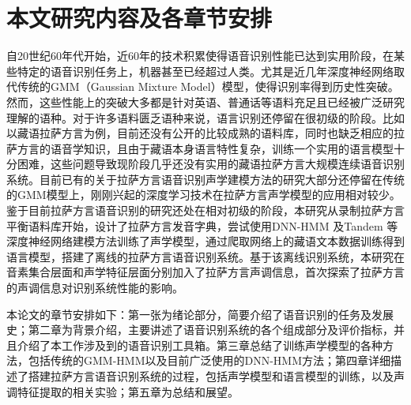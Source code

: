 \section{本文研究内容及各章节安排}
自20世纪60年代开始，近60年的技术积累使得语音识别性能已达到实用阶段，在某些特定的语音识别任务上，机器甚至已经超过人类。尤其是近几年深度神经网络取代传统的GMM（Gaussian Mixture Model）模型，使得识别率得到历史性突破。然而，这些性能上的突破大多都是针对英语、普通话等语料充足且已经被广泛研究理解的语种。对于许多语料匮乏语种来说，语言识别还停留在很初级的阶段。比如以藏语拉萨方言为例，目前还没有公开的比较成熟的语料库，同时也缺乏相应的拉萨方言的语音学知识，且由于藏语本身语言特性复杂，训练一个实用的语言模型十分困难，这些问题导致现阶段几乎还没有实用的藏语拉萨方言大规模连续语音识别系统。目前已有的关于拉萨方言语音识别声学建模方法的研究大部分还停留在传统的GMM模型上，刚刚兴起的深度学习技术在拉萨方言声学模型的应用相对较少。鉴于目前拉萨方言语音识别的研究还处在相对初级的阶段，本研究从录制拉萨方言平衡语料库开始，设计了拉萨方言发音字典，尝试使用DNN-HMM 及Tandem 等深度神经网络建模方法训练了声学模型，通过爬取网络上的藏语文本数据训练得到语言模型，搭建了离线的拉萨方言语音识别系统。基于该离线识别系统，本研究在音素集合层面和声学特征层面分别加入了拉萨方言声调信息，首次探索了拉萨方言的声调信息对识别系统性能的影响。

本论文的章节安排如下：第一张为绪论部分，简要介绍了语音识别的任务及发展史；第二章为背景介绍，主要讲述了语音识别系统的各个组成部分及评价指标，并且介绍了本工作涉及到的语音识别工具箱。第三章总结了训练声学模型的各种方法，包括传统的GMM-HMM以及目前广泛使用的DNN-HMM方法；第四章详细描述了搭建拉萨方言语音识别系统的过程，包括声学模型和语言模型的训练，以及声调特征提取的相关实验；第五章为总结和展望。
